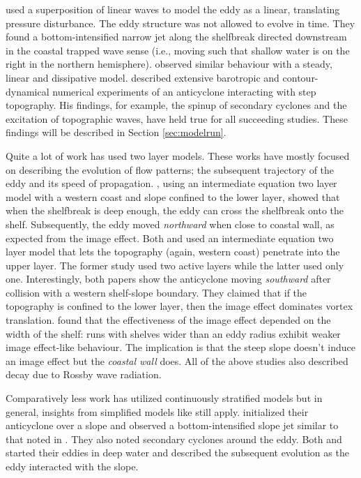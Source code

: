 \citet{Chapman1987} used a superposition of linear waves to model the eddy as a linear, translating pressure disturbance. The eddy structure was not allowed to evolve in time. They found a bottom-intensified narrow jet along the shelfbreak directed downstream in the coastal trapped wave sense (i.e., moving such that shallow water is on the right in the northern hemisphere). \citet{Kelly1988} observed similar behaviour with a steady, linear and dissipative model. \citet{Wang1992} described extensive barotropic and contour-dynamical numerical experiments of an anticyclone interacting with step topography. His findings, for example, the spinup of secondary cyclones and the excitation of topographic waves, have held true for all succeeding studies. These findings will be described in Section \ref{sec:modelrun}.

Quite a lot of work has used two layer models. These works have mostly focused on describing the evolution of flow patterns; the subsequent trajectory of the eddy and its speed of propagation. \citet{Sutyrin2003}, using an intermediate equation two layer model with a western coast and slope confined to the lower layer, showed that when the shelfbreak is deep enough, the eddy can cross the shelfbreak onto the shelf. Subsequently, the eddy moved \emph{northward} when close to coastal wall, as expected from the image effect. Both \citet{Frolov2004} and \citet{Sutyrin2010} used an intermediate equation two layer model that lets the topography (again, western coast) penetrate into the upper layer. The former study used two active layers while the latter used only one. Interestingly, both papers show the anticyclone moving \emph{southward} after collision with a western shelf-slope boundary. They claimed that if the topography is confined to the lower layer, then the image effect dominates vortex translation. \citet{Sutyrin2003} found that the effectiveness of the image effect depended on the width of the shelf: runs with shelves wider than an eddy radius exhibit weaker image effect-like behaviour. The implication is that the steep slope doesn't induce an image effect but the \emph{coastal wall} does. All of the above studies also described decay due to Rossby wave radiation.

Comparatively less work has utilized continuously stratified models but in general, insights from simplified models like \citet{Wang1992} still apply. \citet{Oey2004} initialized their anticyclone over a slope and observed a bottom-intensified slope jet similar to that noted in \citet{Chapman1987}. They also noted secondary cyclones around the eddy. Both \citet{Hyun2008} and \citet{Wei2009} started their eddies in deep water and described the subsequent evolution as the eddy interacted with the slope.
